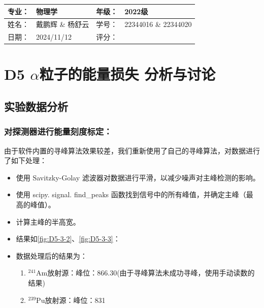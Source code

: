 \documentclass[dvipsnames, svgnames,a4paper,11pt]{article}
\begin{document}



	

\clearpage
\begin{table}
	\renewcommand\arraystretch{1.7}
	\begin{tabularx}{\textwidth}{|X|X|X|X|}
	\hline
	专业：& 物理学 &年级：& 2022级\\
	\hline
	姓名： & 戴鹏辉 \& 杨舒云 & 学号：& 22344016 \& 22344020\\
	\hline
    日期：& 2024/11/12 & 评分： &\\
	\hline
	\end{tabularx}
\end{table}

\section{D5 \quad $\alpha$粒子的能量损失 \quad\heiti 分析与讨论}

\subsection{实验数据分析}


	\subsubsection{对探测器进行能量刻度标定：}

		由于软件内置的寻峰算法效果较差，我们重新使用了自己的寻峰算法，对数据进行了如下处理：
		\begin{itemize}
			\item 使用 Savitzky-Golay 滤波器对数据进行平滑，以减少噪声对主峰检测的影响。
			\item 使用 scipy. signal. find\_peaks 函数找到信号中的所有峰值，并确定主峰（最高的峰值）。
			\item 计算主峰的半高宽。
			\item 结果如\cref{fig:D5-3-2}、\cref{fig:D5-3-3}：
			\item 数据处理后的结果为：
				\begin{enumerate}
					\item $^{241}\mathrm{Am}$放射源：峰位：866.30(由于寻峰算法未成功寻峰，使用手动读数的结果)
					\item $^{239}\mathrm{Pu}$放射源：峰位：831
				\end{enumerate}
		\end{itemize}
\end{document}
